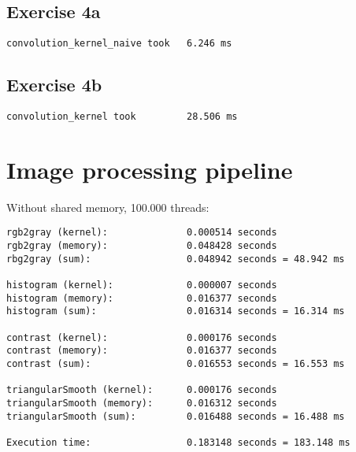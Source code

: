 \documentclass[a4paper]{article}
\begin{document}
\subsection{Exercise 4a}

\begin{verbatim}
convolution_kernel_naive took   6.246 ms
\end{verbatim}

\subsection{Exercise 4b}

\begin{verbatim}
convolution_kernel took         28.506 ms
\end{verbatim}

\section{Image processing pipeline}

Without shared memory, 100.000 threads:

\begin{verbatim}
rgb2gray (kernel):              0.000514 seconds
rgb2gray (memory):              0.048428 seconds
rbg2gray (sum):                 0.048942 seconds = 48.942 ms

histogram (kernel):             0.000007 seconds
histogram (memory):             0.016377 seconds
histogram (sum):                0.016314 seconds = 16.314 ms

contrast (kernel):              0.000176 seconds
contrast (memory):              0.016377 seconds
contrast (sum):                 0.016553 seconds = 16.553 ms

triangularSmooth (kernel):      0.000176 seconds
triangularSmooth (memory):      0.016312 seconds
triangularSmooth (sum):         0.016488 seconds = 16.488 ms

Execution time:                 0.183148 seconds = 183.148 ms 		
\end{verbatim}
\end{document}
